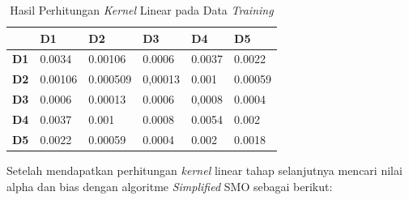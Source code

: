\begin{table}[H]
	\caption{Hasil Perhitungan \textit{Kernel} Linear pada Data \textit{Training}}
	\centering
	\small
	\begin{adjustbox}{width=1\textwidth}
	\begin{tabular}{|p{2cm}|p{2cm}|p{2cm}|p{1.9cm}|p{1.9cm}|p{1.5cm}|}
		\hline
		& \textbf{D1} & \textbf{D2} & \textbf{D3} & \textbf{D4} & \textbf{D5} \\
		\hline
		\textbf{D1} & 0.0034 & 0.00106 & 0.0006 & 0.0037 & 0.0022 \\
		\hline
		\textbf{D2} & 0.00106 & 0.000509 & 0,00013 & 0.001 & 0.00059 \\
		\hline
		\textbf{D3} & 0.0006 & 0.00013 & 0.0006 & 0,0008 & 0.0004 \\
		\hline
		\textbf{D4} & 0.0037 & 0.001 & 0.0008 & 0.0054 & 0.002 \\
		\hline
		\textbf{D5} & 0.0022 & 0.00059 & 0.0004 & 0.002 & 0.0018 \\
		\hline
	\end{tabular}
	\end{adjustbox}
\end{table}
Setelah mendapatkan perhitungan \textit{kernel} linear tahap selanjutnya mencari nilai alpha dan bias dengan algoritme \textit{Simplified} SMO sebagai berikut:
